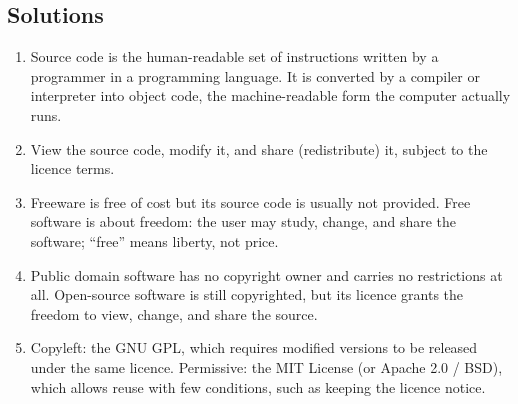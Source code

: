 \documentclass[11pt]{article}
\begin{document}
\subsection*{Solutions}
\begingroup\small
\begin{enumerate}[label=\arabic*.]
  \item Source code is the human-readable set of instructions written by a
    programmer in a programming language. It is converted by a compiler or
    interpreter into object code, the machine-readable form the computer
    actually runs.
  \item View the source code, modify it, and share (redistribute) it, subject
    to the licence terms.
  \item Freeware is free of cost but its source code is usually not provided.
    Free software is about freedom: the user may study, change, and share the
    software; ``free'' means liberty, not price.
  \item Public domain software has no copyright owner and carries no
    restrictions at all. Open-source software is still copyrighted, but its
    licence grants the freedom to view, change, and share the source.
  \item Copyleft: the GNU GPL, which requires modified versions to be released
    under the same licence. Permissive: the MIT License (or Apache 2.0 / BSD),
    which allows reuse with few conditions, such as keeping the licence
    notice.
\end{enumerate}
\endgroup
\end{document}
